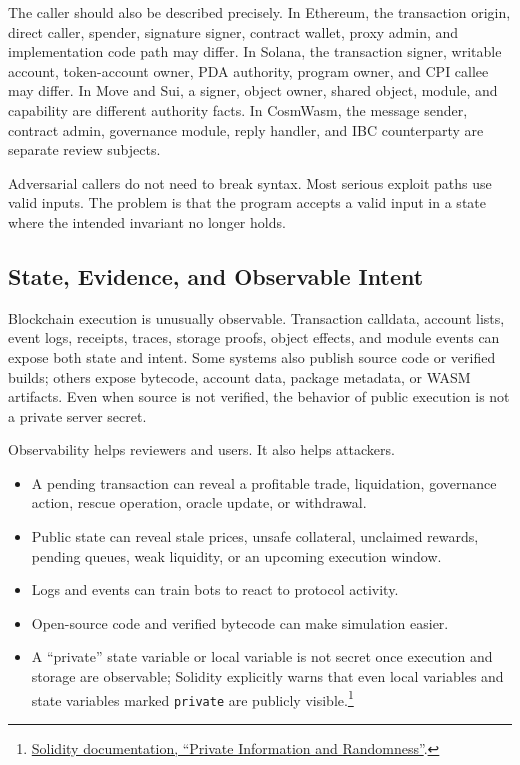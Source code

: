 The caller should also be described precisely. In Ethereum, the transaction origin, direct caller, spender, signature signer, contract wallet, proxy admin, and implementation code path may differ. In Solana, the transaction signer, writable account, token-account owner, PDA authority, program owner, and CPI callee may differ. In Move and Sui, a signer, object owner, shared object, module, and capability are different authority facts. In CosmWasm, the message sender, contract admin, governance module, reply handler, and IBC counterparty are separate review subjects.

Adversarial callers do not need to break syntax. Most serious exploit paths use valid inputs. The problem is that the program accepts a valid input in a state where the intended invariant no longer holds.

\subsection{State, Evidence, and Observable Intent}

Blockchain execution is unusually observable. Transaction calldata, account lists, event logs, receipts, traces, storage proofs, object effects, and module events can expose both state and intent. Some systems also publish source code or verified builds; others expose bytecode, account data, package metadata, or WASM artifacts. Even when source is not verified, the behavior of public execution is not a private server secret.

Observability helps reviewers and users. It also helps attackers.

\begin{itemize}
\item A pending transaction can reveal a profitable trade, liquidation, governance action, rescue operation, oracle update, or withdrawal.
\item Public state can reveal stale prices, unsafe collateral, unclaimed rewards, pending queues, weak liquidity, or an upcoming execution window.
\item Logs and events can train bots to react to protocol activity.
\item Open-source code and verified bytecode can make simulation easier.
\item A ``private'' state variable or local variable is not secret once execution and storage are observable; Solidity explicitly warns that even local variables and state variables marked \texttt{private} are publicly visible.\footnote{\href{https://docs.soliditylang.org/en/latest/security-considerations.html\#private-information-and-randomness}{Solidity documentation, ``Private Information and Randomness''}.}
\end{itemize}


